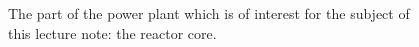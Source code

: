 \begin{figure}[ht!]
\protect {}\protect
\caption{\label{fig:reactorcore} \footnotesize{The part of the power plant which is of interest for the subject of this lecture note: the reactor core.}}
\end{figure}

